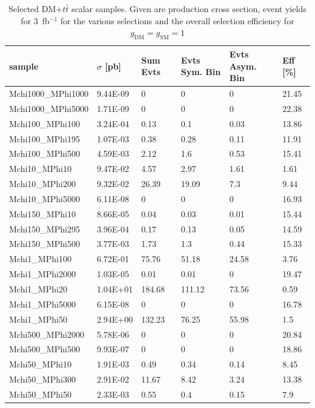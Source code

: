\begin{table}[h!]
\small
\centering
\begin{tabular}{l|lllll}
\hline
sample             & $\sigma$ [pb] & Sum Evts       & Evts Sym. Bin & Evts Asym. Bin & Eff  [\%]   \\\hline
Mchi1000\_MPhi1000 & 9.44E-09 & 0      & 0      & 0     & 21.45 \\
Mchi1000\_MPhi5000 & 1.71E-09 & 0      & 0      & 0     & 22.38 \\
Mchi100\_MPhi100   & 3.24E-04 & 0.13   & 0.1    & 0.03  & 13.86 \\
Mchi100\_MPhi195   & 1.07E-03 & 0.38   & 0.28   & 0.11  & 11.91 \\
Mchi100\_MPhi500   & 4.59E-03 & 2.12   & 1.6    & 0.53  & 15.41 \\
Mchi10\_MPhi10     & 9.47E-02 & 4.57   & 2.97   & 1.61  & 1.61  \\
Mchi10\_MPhi200    & 9.32E-02 & 26.39  & 19.09  & 7.3   & 9.44  \\
Mchi10\_MPhi5000   & 6.11E-08 & 0      & 0      & 0     & 16.93 \\
Mchi150\_MPhi10    & 8.66E-05 & 0.04   & 0.03   & 0.01  & 15.44 \\
Mchi150\_MPhi295   & 3.96E-04 & 0.17   & 0.13   & 0.05  & 14.59 \\
Mchi150\_MPhi500   & 3.77E-03 & 1.73   & 1.3    & 0.44  & 15.33 \\
Mchi1\_MPhi100     & 6.72E-01 & 75.76  & 51.18  & 24.58 & 3.76  \\
Mchi1\_MPhi2000    & 1.03E-05 & 0.01   & 0.01   & 0     & 19.47 \\
Mchi1\_MPhi20      & 1.04E+01 & 184.68 & 111.12 & 73.56 & 0.59  \\
Mchi1\_MPhi5000    & 6.15E-08 & 0      & 0      & 0     & 16.78 \\
Mchi1\_MPhi50      & 2.94E+00 & 132.23 & 76.25  & 55.98 & 1.5   \\
Mchi500\_MPhi2000  & 5.78E-06 & 0      & 0      & 0     & 20.84 \\
Mchi500\_MPhi500   & 9.93E-07 & 0      & 0      & 0     & 18.86 \\
Mchi50\_MPhi10     & 1.91E-03 & 0.49   & 0.34   & 0.14  & 8.45  \\
Mchi50\_MPhi300    & 2.91E-02 & 11.67  & 8.42   & 3.24  & 13.38 \\
Mchi50\_MPhi50     & 2.33E-03 & 0.55   & 0.4    & 0.15  & 7.9  \\
\hline
\end{tabular}
\caption{Selected DM+$t\bar{t}$ scalar samples. Given are production cross section, event yields for 3~fb$^{-1 }$ for the various selections and the overall selection efficiency for $g_\textrm{DM}=g_\textrm{SM}=1$ \label{tab:dmtt_S}}
\end{table}

